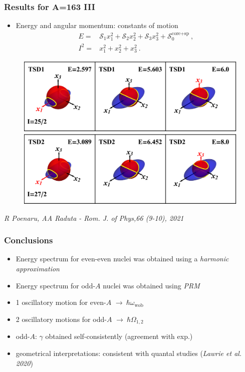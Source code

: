 \documentclass{beamer}
\begin{document}
\begin{frame}
  \frametitle{Results for A=163 III}
  \begin{itemize}
    \item Energy and angular momentum: constants of motion
    \begin{align}
      E=&\mathcal{S}_1x_1^2+\mathcal{S}_2x_2^2+\mathcal{S}_3x_3^2+\mathcal{S}_0^\text{core+sp}\ ,\\
      I^2=&x_1^2+x_2^2+x_3^2\ .
  \end{align}
  \end{itemize}
  \begin{figure}
    \centering
      \includegraphics[scale=0.5]{figs/tsd1_spin1.eps}
      \includegraphics[scale=0.5]{figs/tsd2_spin1.eps}
    \end{figure}
    \tiny{\emph{R Poenaru, AA Raduta - Rom. J. of Phys,66 (9-10), 2021}}
\end{frame}

\begin{frame}
  \frametitle{Conclusions}
  \begin{itemize}
    \item Energy spectrum for even-even nuclei was obtained using a \emph{harmonic approximation}
    \item Energy spectrum for odd-$A$ nuclei was obtained using \emph{PRM}
    \item 1 oscillatory motion for even-$A$ $\longrightarrow\ \hbar\omega_\text{wob}$
    \item 2 oscillatory motions for odd-$A$ $\longrightarrow\ \hbar\Omega_{1,2}$
    \item odd-$A$: $\gamma$ obtained self-consistently (agreement with exp.)
    \item geometrical interpretations: consistent with quantal studies (\emph{Lawrie et al. 2020})
  \end{itemize}
\end{frame}
\end{document}
